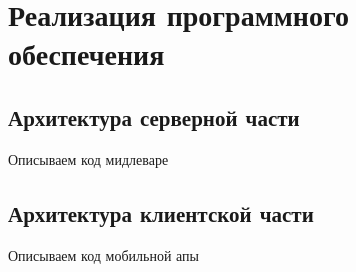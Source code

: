 \chapter{Реализация программного обеспечения} \label{ch:ch3}

\section{Архитектура серверной части} \label{sec:ch3:sec1}
Описываем код мидлеваре

\section{Архитектура клиентской части} \label{sec:ch3:sec2}
Описываем код мобильной апы